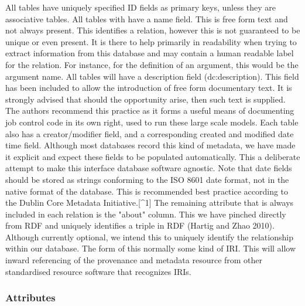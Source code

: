 All tables have uniquely specified ID fields as primary keys, unless
they are associative tables. All tables with have a name field. This is
free form text and not always present. This identifies a relation,
however this is not guaranteed to be unique or even present. It is there
to help primarily in readability when trying to extract information from
this database and may contain a human readable label for the relation.
For instance, for the definition of an argument, this would be the
argument name. All tables will have a description field
(dc:description). This field has been included to allow the introduction
of free form documentary text. It is strongly advised that should the
opportunity arise, then such text is supplied. The authors recommend
this practice as it forms a useful means of documenting job control code
in its own right, used to run these large scale models. Each table also
has a creator/modifier field, and a corresponding created and modified
date time field. Although most databases record this kind of metadata,
we have made it explicit and expect these fields to be populated
automatically. This a deliberate attempt to make this interface database
software agnostic. Note that date fields should be stored as strings
conforming to the ISO 8601 date format, not in the native format of the
database. This is recommended best practice according to the Dublin Core
Metadata Initiative.{[}\^{}1{]} The remaining attribute that is always
included in each relation is the "about" column. This we have pinched
directly from RDF and uniquely identifies a triple in RDF (Hartig and
Zhao 2010). Although currently optional, we intend this to uniquely
identify the relationship within our database. The form of this normally
some kind of IRI. This will allow inward referencing of the provenance
and metadata resource from other standardised resource software that
recognizes IRIs.

\subsubsection{Attributes}\label{attributes}

